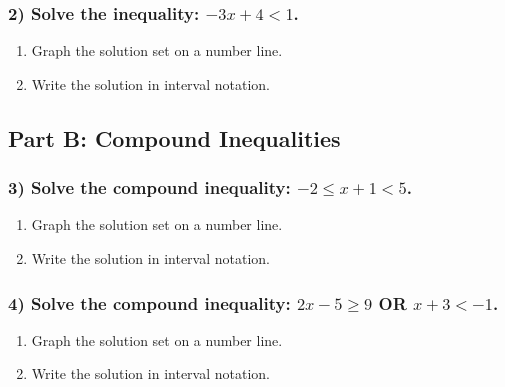 \documentclass[12pt]{article}
\begin{document}
                \vspace{0.5cm}

            \subsubsection*{2) Solve the inequality: $-3x + 4 < 1$.}

                \begin{enumerate}
                    \item[(a)] Graph the solution set on a number line.
                    \item[(b)] Write the solution in interval notation.
                \end{enumerate}
                
                \vspace{0.5cm}
        
        \subsection*{Part B: Compound Inequalities}
            
            \subsubsection*{3) Solve the compound inequality: $-2 \leq x + 1 < 5$.}

                \begin{enumerate}
                    \item[(a)] Graph the solution set on a number line.
                    \item[(b)] Write the solution in interval notation.
                \end{enumerate}
                
                \vspace{0.5cm}

            \subsubsection*{4) Solve the compound inequality: $2x - 5 \geq 9$ OR $x + 3 < -1$.}

                \begin{enumerate}
                    \item[(a)] Graph the solution set on a number line.
                    \item[(b)] Write the solution in interval notation.
                \end{enumerate}
                
\end{document}
